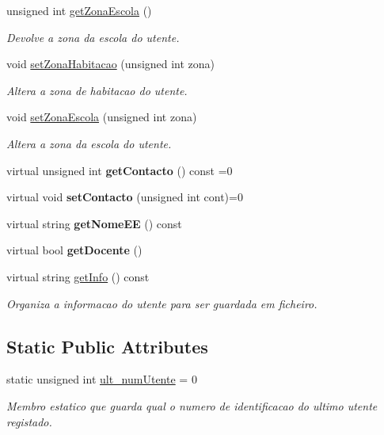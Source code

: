 \begin{DoxyCompactItemize}
unsigned int \mbox{\hyperlink{class_utente_a9f7ee5806d6a187cf8ab27c2bd36c501}{get\+Zona\+Escola}} ()
\begin{DoxyCompactList}\small\item\em Devolve a zona da escola do utente. \end{DoxyCompactList}\item 
void \mbox{\hyperlink{class_utente_a7276cad0368359751b7aad74ed305806}{set\+Zona\+Habitacao}} (unsigned int zona)
\begin{DoxyCompactList}\small\item\em Altera a zona de habitacao do utente. \end{DoxyCompactList}\item 
void \mbox{\hyperlink{class_utente_ad6d072f72c3d373bbb0a7ace551fff55}{set\+Zona\+Escola}} (unsigned int zona)
\begin{DoxyCompactList}\small\item\em Altera a zona da escola do utente. \end{DoxyCompactList}\item 
\mbox{\label{class_utente_a899016287b536c9b1feaf8d442b67c5b}} 
virtual unsigned int {\bfseries get\+Contacto} () const =0
\item 
\mbox{\label{class_utente_a0c9a0884b16349201f12fd75dd6c4184}} 
virtual void {\bfseries set\+Contacto} (unsigned int cont)=0
\item 
\mbox{\label{class_utente_a6633751f30f241cbb95152f09d69c413}} 
virtual string {\bfseries get\+Nome\+EE} () const
\item 
\mbox{\label{class_utente_a004a0a657b7f44cfe19e94c336d1ad6b}} 
virtual bool {\bfseries get\+Docente} ()
\item 
virtual string \mbox{\hyperlink{class_utente_aee03eae2a7154e7b4713b2be195d548f}{get\+Info}} () const
\begin{DoxyCompactList}\small\item\em Organiza a informacao do utente para ser guardada em ficheiro. \end{DoxyCompactList}\end{DoxyCompactItemize}
\subsection*{Static Public Attributes}
\begin{DoxyCompactItemize}
\item 
\mbox{\label{class_utente_a61402075e3df7b7b21e141ea7e1b5f0f}} 
static unsigned int \mbox{\hyperlink{class_utente_a61402075e3df7b7b21e141ea7e1b5f0f}{ult\+\_\+num\+Utente}} = 0
\begin{DoxyCompactList}\small\item\em Membro estatico que guarda qual o numero de identificacao do ultimo utente registado. \end{DoxyCompactList}\end{DoxyCompactItemize}
